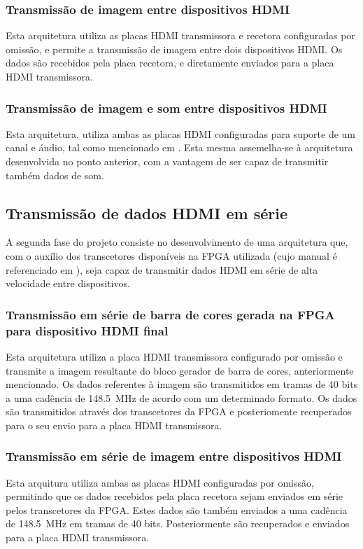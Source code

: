 \documentclass[a4paper]{IEEEtran}
\begin{document}
\subsubsection{Transmissão de imagem entre dispositivos HDMI}
Esta arquitetura utiliza as placas HDMI transmissora e recetora configuradas por omissão, e permite a transmissão de imagem entre dois dispositivos HDMI. Os dados são recebidos pela placa recetora, e diretamente enviados para a placa HDMI transmissora.
\\
\subsubsection{Transmissão de imagem e som entre dispositivos HDMI}
Esta arquitetura, utiliza ambas as placas HDMI configuradas para suporte de um canal e áudio, tal como mencionado em \cite{R014}. Esta mesma assemelha-se à arquitetura desenvolvida no ponto anterior, com a vantagem de ser capaz de transmitir também dados de som.

\subsection{Transmissão de dados HDMI em série}
A segunda fase do projeto consiste no desenvolvimento de uma arquitetura que, com o auxílio dos transcetores disponíveis na FPGA utilizada (cujo manual é referenciado em \cite{R011}), seja capaz de transmitir dados HDMI em série de alta velocidade entre dispositivos.
\\
\subsubsection{Transmissão em série de barra de cores gerada na FPGA para dispositivo HDMI final}
Esta arquitetura utiliza a placa HDMI transmissora configurado por omissão e transmite a imagem resultante do bloco gerador de barra de cores, anteriormente mencionado. Os dados referentes à imagem são transmitidos em tramas de 40 bits a uma cadência de \SI{148.5}{\mega\hertz} de acordo com um determinado formato. Os dados são transmitidos através dos transcetores da FPGA e posteriomente recuperados para o seu envio para a placa HDMI transmissora.
\\
\subsubsection{Transmissão em série de imagem entre dispositivos HDMI}
Esta arquitura utiliza ambas as placas HDMI configuradas por omissão, permitindo que os dados recebidos pela placa recetora sejam enviados em série pelos transcetores da FPGA. Estes dados são também enviados a uma cadência de \SI{148.5}{\mega\hertz} em tramas de 40 bits. Posteriormente são recuperados e enviados para a placa HDMI transmissora.
\end{document}
